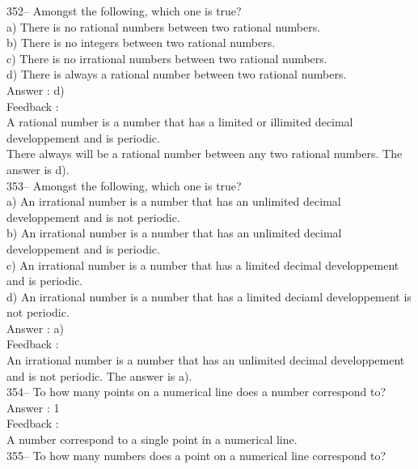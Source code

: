 \documentclass[letterpaper, 12pt]{article}
\begin{document}
352-- Amongst the following, which one is true?\\
a) There is no rational numbers between two rational numbers.\\
b) There is no integers between two rational numbers.\\
c) There is no irrational numbers between two rational numbers.\\
d) There is always a rational number between two rational numbers.\\

Answer : d)\\

Feedback :\\
A rational number is a number that has a limited or illimited decimal developpement and is periodic.\\
There always will be a rational number between any two rational numbers.
The answer is d).\\

353-- Amongst the following, which one is true?\\
a) An irrational number is a number that has an unlimited decimal developpement and is not periodic.\\
b) An irrational number is a number that has an unlimited decimal developpement and is periodic.\\
c) An irrational number is a number that has a limited decimal developpement and is periodic.\\
d) An irrational number is a number that has a limited deciaml developpement is not periodic.\\

Answer : a)\\

Feedback : \\
An irrational number is a number that has an unlimited decimal developpement and is not periodic. 
The answer is a).\\

354-- To how many points on a numerical line does a number correspond to?\\

Answer : 1\\

Feedback : \\
A number correspond to a single point in a numerical line.\\

355-- To how many numbers does a point on a numerical line correspond to?\\
\end{document}
